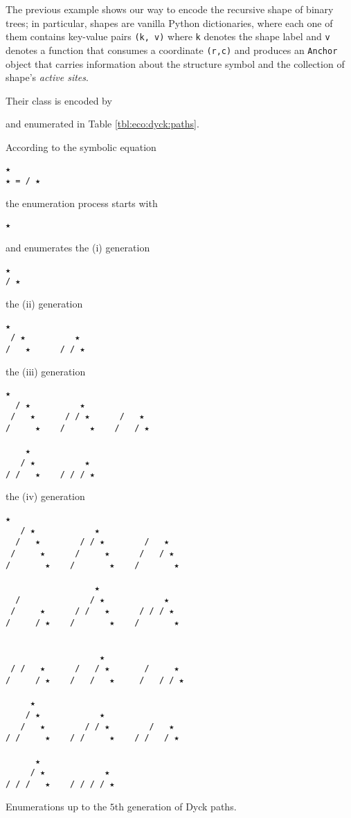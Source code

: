 The previous example shows our way to encode the recursive shape of binary
trees; in particular, shapes are vanilla Python dictionaries, where each one of
them contains key-value pairs \verb|(k, v)| where \verb|k| denotes the shape
label and \verb|v| denotes a function that consumes a coordinate \verb|(r,c)|
and produces an \verb|Anchor| object that carries information about the
structure symbol and the collection of shape's \textit{active sites}.


\begin{example}
Their class is encoded by

and enumerated in Table \ref{tbl:eco:dyck:paths}.

\begin{margintable}
\noindent According to the symbolic equation
\begin{Verbatim}[baselinestretch=0.5,fontsize=\footnotesize]
     ★
★ = / ★
\end{Verbatim}
the enumeration process starts with
\begin{Verbatim}[baselinestretch=0.5,fontsize=\footnotesize]
★
\end{Verbatim}
and enumerates the (i) generation
\begin{Verbatim}[baselinestretch=0.5,fontsize=\footnotesize]
 ★
/ ★
\end{Verbatim}
the (ii) generation
\begin{Verbatim}[baselinestretch=0.5,fontsize=\footnotesize]
  ★
 / ★          ★
/   ★      / / ★
\end{Verbatim}
the (iii) generation
\begin{Verbatim}[baselinestretch=0.5,fontsize=\footnotesize]
   ★
  / ★          ★
 /   ★      / / ★      /   ★
/     ★    /     ★    /   / ★

    ★
   / ★          ★
/ /   ★    / / / ★
\end{Verbatim}
the (iv) generation
\begin{Verbatim}[baselinestretch=0.5,fontsize=\footnotesize]
    ★
   / ★            ★
  /   ★        / / ★        /   ★
 /     ★      /     ★      /   / ★
/       ★    /       ★    /       ★

                  ★
  /              / ★            ★
 /     ★      / /   ★      / / / ★
/     / ★    /       ★    /       ★


                   ★
 / /   ★      /   / ★       /     ★
/     / ★    /   /   ★     /   / / ★

     ★
    / ★            ★
   /   ★        / / ★        /   ★
/ /     ★    / /     ★    / /   / ★

      ★
     / ★            ★
/ / /   ★    / / / / ★
\end{Verbatim}
\caption{Enumerations up to the $5$th generation of Dyck paths.}
\label{tbl:eco:dyck:paths}
\end{margintable}
\end{example}

